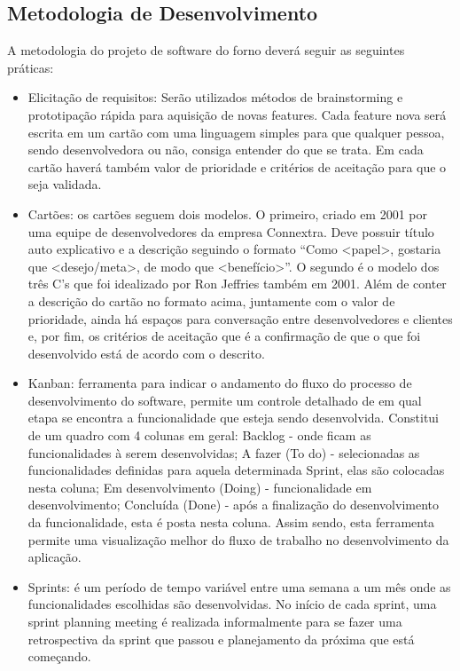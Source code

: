\subsection{Metodologia de Desenvolvimento}

A metodologia do projeto de software do forno deverá seguir as seguintes práticas:
\begin{itemize}
	\item Elicitação de requisitos: Serão utilizados métodos de brainstorming e prototipação rápida para aquisição de novas features. Cada feature nova será escrita em um cartão com uma linguagem simples para que qualquer pessoa, sendo desenvolvedora ou não, consiga entender do que se trata. Em cada cartão haverá também valor de prioridade e critérios de aceitação para que o seja validada.
	\item Cartões: os cartões seguem dois modelos. O primeiro, criado em 2001 por uma equipe de desenvolvedores da empresa Connextra. Deve possuir título auto explicativo e a descrição seguindo o formato “Como <papel>, gostaria que <desejo/meta>, de modo que <benefício>”. O segundo é o modelo dos três C’s que foi idealizado por Ron Jeffries também em 2001. Além de conter a descrição do cartão no formato acima, juntamente com o valor de prioridade, ainda há espaços para conversação entre desenvolvedores e clientes e, por fim, os critérios de aceitação que é a confirmação de que o que foi desenvolvido está de acordo com o descrito.
	\item Kanban: ferramenta para indicar o andamento do fluxo do processo de desenvolvimento do software, permite um controle detalhado de em qual etapa se encontra a funcionalidade que esteja sendo desenvolvida. Constitui de um quadro com 4 colunas em geral: Backlog - onde ficam as funcionalidades à serem desenvolvidas; A fazer (To do) - selecionadas as funcionalidades definidas para aquela determinada Sprint, elas são colocadas nesta coluna; Em desenvolvimento (Doing) - funcionalidade em desenvolvimento; Concluída (Done) - após a finalização do desenvolvimento da funcionalidade, esta é posta nesta coluna. Assim sendo, esta ferramenta permite uma visualização melhor do fluxo de trabalho no desenvolvimento da aplicação.
	\item Sprints: é um período de tempo variável entre uma semana a um mês onde as funcionalidades escolhidas são desenvolvidas. No início de cada sprint, uma sprint planning meeting é realizada informalmente para se fazer uma retrospectiva da sprint que passou e planejamento da próxima que está começando.

\end{itemize}

